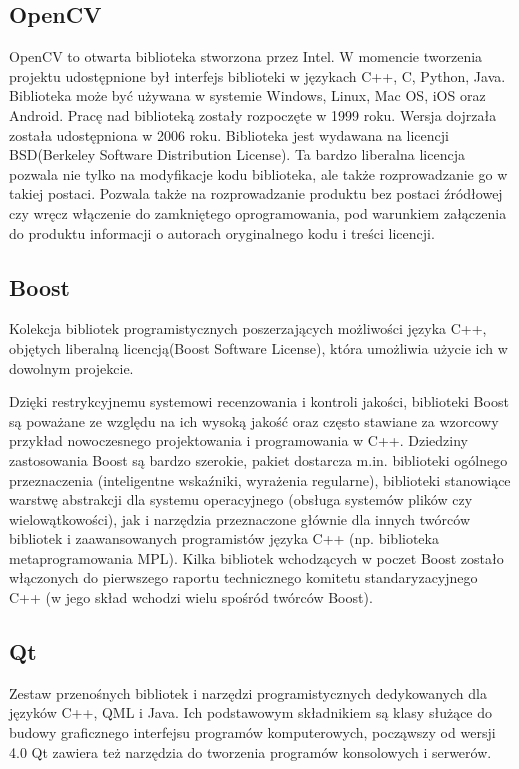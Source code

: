 \documentclass[eng,printmode]{mgr}
\begin{document}
\subsection{OpenCV}

OpenCV to otwarta biblioteka stworzona przez Intel. W momencie tworzenia projektu udostępnione był interfejs biblioteki w językach C++, C, Python, Java. Biblioteka może być używana w systemie Windows, Linux, Mac OS, iOS oraz Android. Pracę nad biblioteką zostały rozpoczęte w 1999 roku. Wersja dojrzała została udostępniona w 2006 roku. Biblioteka jest wydawana na licencji BSD(Berkeley Software Distribution License). Ta bardzo liberalna licencja pozwala nie tylko na modyfikacje kodu biblioteka, ale także rozprowadzanie go w takiej postaci. Pozwala także na rozprowadzanie produktu bez postaci źródłowej czy wręcz włączenie do zamkniętego oprogramowania, pod warunkiem załączenia do produktu informacji o autorach oryginalnego kodu i treści licencji.
\subsection{Boost}

Kolekcja bibliotek programistycznych poszerzających możliwości języka C++, objętych liberalną licencją(Boost Software License), która umożliwia użycie ich w dowolnym projekcie.

Dzięki restrykcyjnemu systemowi recenzowania i kontroli jakości, biblioteki Boost są poważane ze względu na ich wysoką jakość oraz często stawiane za wzorcowy przykład nowoczesnego projektowania i programowania w C++. Dziedziny zastosowania Boost są bardzo szerokie, pakiet dostarcza m.in. biblioteki ogólnego przeznaczenia (inteligentne wskaźniki, wyrażenia regularne), biblioteki stanowiące warstwę abstrakcji dla systemu operacyjnego (obsługa systemów plików czy wielowątkowości), jak i narzędzia przeznaczone głównie dla innych twórców bibliotek i zaawansowanych programistów języka C++ (np. biblioteka metaprogramowania MPL). Kilka bibliotek wchodzących w poczet Boost zostało włączonych do pierwszego raportu technicznego komitetu standaryzacyjnego C++ (w jego skład wchodzi wielu spośród twórców Boost).\cite{wikiboost}
\subsection{Qt}
Zestaw przenośnych bibliotek i narzędzi programistycznych dedykowanych dla języków C++, QML i Java. Ich podstawowym składnikiem są klasy służące do budowy graficznego interfejsu programów komputerowych, począwszy od wersji 4.0 Qt zawiera też narzędzia do tworzenia programów konsolowych i serwerów.
\end{document}
